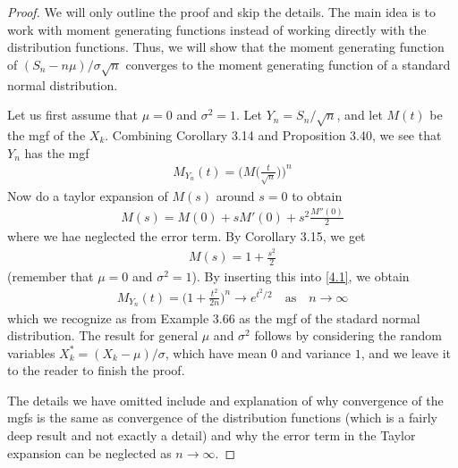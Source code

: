 \begin{proof}
  We will only outline the proof and skip the details. The main idea is to work with moment generating functions instead of working directly with the distribution functions. Thus, we will show that the moment generating function of $(S_n - n \mu)/\sigma \sqrt{n}$ converges to the moment generating function of a standard normal distribution.

  Let us first assume that $\mu = 0$ and $\sigma^2 = 1$.
  Let $Y_n = S_n/\sqrt{n}$, and let $M(t)$ be the mgf of the $X_k$. Combining Corollary 3.14 and Proposition 3.40, we see that $Y_n$ has the mgf
  \begin{align}\label{4.1}
    M_{Y_n}(t) = \bigg( M\bigg( \frac{t}{\sqrt{n}} \bigg) \bigg)^n
  \end{align}
  Now do a taylor expansion of $M(s)$ around $s = 0$ to obtain
  \begin{align*}
    M(s) = M(0) + sM'(0) + s^2\frac{M''(0)}{2}
  \end{align*}
  where we hae neglected the error term. By Corollary 3.15, we get
  \begin{align*}
    M(s) = 1 + \frac{s^2}{2}
  \end{align*}
  (remember that $\mu = 0$ and $\sigma^2 = 1$).
  By inserting this into \eqref{4.1}, we obtain
  \begin{align*}
    M_{Y_n}(t) = \bigg( 1 + \frac{t^2}{2n} \bigg)^n \rightarrow e^{t^2/2}
    \quad \text{as} \quad
    n \rightarrow \infty
  \end{align*}
  which we recognize as from Example 3.66 as the mgf of the stadard normal distribution.
  The result for general $\mu$ and $\sigma^2$ follows by considering the random variables $X^\ast_k = (X_k - \mu)/\sigma$, which have mean $0$ and variance $1$, and we leave it to the reader to finish the proof.

  The details we have omitted include and explanation of why convergence of the mgfs is the same as convergence of the distribution functions (which is a fairly deep result and not exactly a detail) and why the error term in the Taylor expansion can be neglected as $n \rightarrow \infty$.
\end{proof}

